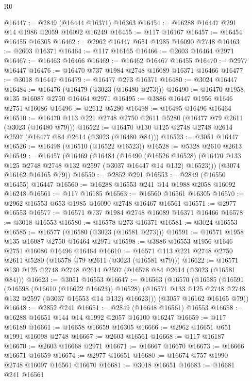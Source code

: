 \begin{lexlean}{R0}
\begin{coremodule}
@16447 := @2849 (@16444 @16371) @16363
@16454 := @16288 @16447 @291 @14 @1986 @2059 @16092 @16249
@16455 := @117 @16167
@16457 := @16454 @16455 @16305
@16462 := @2962 @16447 @651 @1985 @16090 @2748
@16463 := @2603 @16371
@16464 := @117 @16165
@16466 := @2603 @16464 @2971
@16467 := @16463 @16466
@16469 := @16462 @16467 @16455
@16470 := @2977 @16447
@16476 := @16470 @737 @1984 @2748 @16089 @16371 @16466
@16477 := @3018 @16447
@16479 := @16477 @273 @16371
@16480 := @3024 @16447
@16484 := @16476 (@16479 (@3023 (@16480 @273)))
@16490 := @16470 @1958 @135 @16087 @2750 @16464 @2971
@16495 := @3886 @16447 @1956 @1646 @2751 @16086
@16496 := @2612 @5280
@16498 := @16495 @16496 @16464
@16510 := @16470 @113 @221 @2748 @2750 @2611 @5280 (@16477 @79 @2611 (@3023 (@16480 @79)))
@16522 := @16470 @130 @125 @2748 @2748 @2614 @2597 (@16477 @84 @2614 (@3023 (@16480 @84)))
@16523 := @3051 @16447
@16526 := @16498 (@16510 (@16522 @16523))
@16528 := @5328 @2610 @2613
@16549 := @16457
    (@16469
      (@16484
        (@16490
          (@16526 @16528)
          (@16470 @133 @125 @2748 @2748 @132 @2597 (@3037 @16447 @14 @132) @16523)))
      (@3074 @16162 @16165 @79))
@16550 := @2852 @291
@16553 := @2849 (@16550 @16455) @16447
@16560 := @16288 @16553 @241 @14 @1988 @2058 @16092 @16248
@16561 := @117 @16185
@16563 := @16560 @16561 @16305
@16570 := @2962 @16553 @653 @1985 @16090 @2748 @16467 @16561
@16571 := @2977 @16553
@16577 := @16571 @737 @1984 @2748 @16089 @16371 @16466
@16578 := @3018 @16553
@16580 := @16578 @273 @16371
@16581 := @3024 @16553
@16585 := @16577 (@16580 (@3023 (@16581 @273)))
@16591 := @16571 @1958 @135 @16087 @2750 @16464 @2971
@16598 := @3886 @16553 @1956 @1646 @2751 @16086 @16496 @16464
@16610 := @16571 @113 @221 @2748 @2750 @2611 @5280 (@16578 @79 @2611 (@3023 (@16581 @79)))
@16622 := @16571 @130 @125 @2748 @2748 @2614 @2597 (@16578 @84 @2614 (@3023 (@16581 @84)))
@16623 := @3051 @16553
@16647 := @16563
    (@16570
      (@16585
        (@16591
          (@16598 (@16610 (@16622 @16623)) @16528)
          (@16571 @133 @125 @2748 @2748 @132 @2597 (@3037 @16553 @14 @132) @16623)))
      (@3057 @16162 @16165 @79))
@16648 := @2852 @241
@16651 := @2849 (@16648 @16561) @16553
@16658 := @16288 @16651 @144 @14 @1992 @2057 @16100 @16247
@16659 := @117 @16189
@16661 := @16658 @16659 @16305
@16666 := @2962 @16651 @651 @1991 @16098 @2748
@16667 := @2603 @16561
@16668 := @117 @16187
@16670 := @2603 @16668 @2971
@16671 := @16667 @16670
@16673 := @16666 @16671 @16659
@16674 := @2977 @16651
@16680 := @16674 @757 @1990 @2748 @16097 @16561 @16670
@16681 := @3018 @16651
@16683 := @16681 @241 @16561

\end{coremodule}
\end{lexlean}
